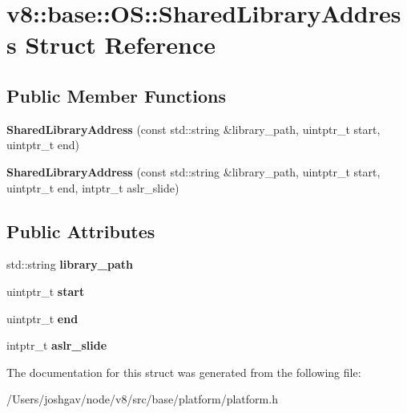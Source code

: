 \hypertarget{structv8_1_1base_1_1_o_s_1_1_shared_library_address}{}\section{v8\+:\+:base\+:\+:OS\+:\+:Shared\+Library\+Address Struct Reference}
\label{structv8_1_1base_1_1_o_s_1_1_shared_library_address}
\subsection*{Public Member Functions}
\begin{DoxyCompactItemize}
\item 
{\bfseries Shared\+Library\+Address} (const std\+::string \&library\+\_\+path, uintptr\+\_\+t start, uintptr\+\_\+t end)\hypertarget{structv8_1_1base_1_1_o_s_1_1_shared_library_address_a27939e44006c9c16f45d4574a3f34149}{}\label{structv8_1_1base_1_1_o_s_1_1_shared_library_address_a27939e44006c9c16f45d4574a3f34149}

\item 
{\bfseries Shared\+Library\+Address} (const std\+::string \&library\+\_\+path, uintptr\+\_\+t start, uintptr\+\_\+t end, intptr\+\_\+t aslr\+\_\+slide)\hypertarget{structv8_1_1base_1_1_o_s_1_1_shared_library_address_ae96323e7d772ccb7d8ed130f1ac6d88f}{}\label{structv8_1_1base_1_1_o_s_1_1_shared_library_address_ae96323e7d772ccb7d8ed130f1ac6d88f}

\end{DoxyCompactItemize}
\subsection*{Public Attributes}
\begin{DoxyCompactItemize}
\item 
std\+::string {\bfseries library\+\_\+path}\hypertarget{structv8_1_1base_1_1_o_s_1_1_shared_library_address_a17d35a93f53f73def82274159e599ac1}{}\label{structv8_1_1base_1_1_o_s_1_1_shared_library_address_a17d35a93f53f73def82274159e599ac1}

\item 
uintptr\+\_\+t {\bfseries start}\hypertarget{structv8_1_1base_1_1_o_s_1_1_shared_library_address_a2d00ba0f4595c5fa36a95fbaab8e3c85}{}\label{structv8_1_1base_1_1_o_s_1_1_shared_library_address_a2d00ba0f4595c5fa36a95fbaab8e3c85}

\item 
uintptr\+\_\+t {\bfseries end}\hypertarget{structv8_1_1base_1_1_o_s_1_1_shared_library_address_afe93a457c1f3c7af9eda3aad907fa3ab}{}\label{structv8_1_1base_1_1_o_s_1_1_shared_library_address_afe93a457c1f3c7af9eda3aad907fa3ab}

\item 
intptr\+\_\+t {\bfseries aslr\+\_\+slide}\hypertarget{structv8_1_1base_1_1_o_s_1_1_shared_library_address_a471c046aae63463b92b4acbd7ce30dd4}{}\label{structv8_1_1base_1_1_o_s_1_1_shared_library_address_a471c046aae63463b92b4acbd7ce30dd4}

\end{DoxyCompactItemize}


The documentation for this struct was generated from the following file\+:\begin{DoxyCompactItemize}
\item 
/\+Users/joshgav/node/v8/src/base/platform/platform.\+h\end{DoxyCompactItemize}
